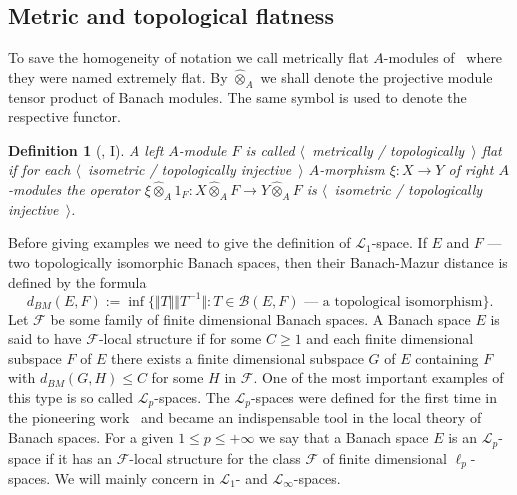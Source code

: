 \documentclass[12pt]{article}
\newcommand{\projmodtens}[1]{\mathbin{\widehat{\otimes}}_{#1}}
\newtheorem{definition}[theorem]{Definition}
\begin{document}

\subsection{Metric and topological
    flatness}\label{SubSectionMetricAndTopologicalFlatness}

To save the homogeneity of notation we call metrically flat $A$-modules
of~\cite{HelMetrFlatNorMod} where they were named extremely flat. By
$\projmodtens{A}$ we shall denote the projective module tensor product of Banach
modules. The same symbol is used to denote the respective functor.

\begin{definition}[\cite{HelMetrFlatNorMod}, I]\label{MetTopFlatMod} A left
    $A$-module $F$ is called $\langle$~metrically / topologically~$\rangle$ flat
    if for each $\langle$~isometric / topologically injective~$\rangle$
    $A$-morphism $\xi:X\to Y$ of right $A$-modules the operator
    $\xi\projmodtens{A} 1_F:X\projmodtens{A} F\to Y\projmodtens{A} F$ is
    $\langle$~isometric / topologically injective~$\rangle$.
\end{definition}

Before giving examples we need to give the definition of $\mathscr{L}_1$-space.
If $E$ and $F$ --- two topologically isomorphic Banach spaces, then their
Banach-Mazur distance is defined by the formula
$$
    d_{BM}(E,F):=\inf \{\Vert T\Vert\Vert T^{-1}\Vert: T \in \mathcal{B}(E,F)
    \mbox{ --- a topological isomorphism}\}.
$$
Let $\mathcal{F}$ be some family of finite dimensional Banach spaces. A Banach
space $E$ is said to have $\mathcal{F}$-local structure if for some $C\geq 1$
and each finite dimensional subspace $F$ of $E$ there exists a finite
dimensional subspace $G$ of $E$ containing $F$ with $d_{BM}(G,H)\leq C$ for some
$H$ in $\mathcal{F}$. One of the most important examples of this type is so
called $\mathscr{L}_p$-spaces. The $\mathscr{L}_p$-spaces were defined for the
first time in the pioneering work~\cite{LinPelAbsSumOpInLpSpAndApp} and became
an indispensable tool in the local theory of Banach spaces. For a given
$1\leq p\leq +\infty$ we say that a Banach space $E$ is an
$\mathscr{L}_{p}$-space if it has an $\mathcal{F}$-local structure for the class
$\mathcal{F}$ of finite dimensional $\ell_p$-spaces. We will mainly concern in
$\mathscr{L}_1$- and $\mathscr{L}_\infty$-spaces.
\end{document}
